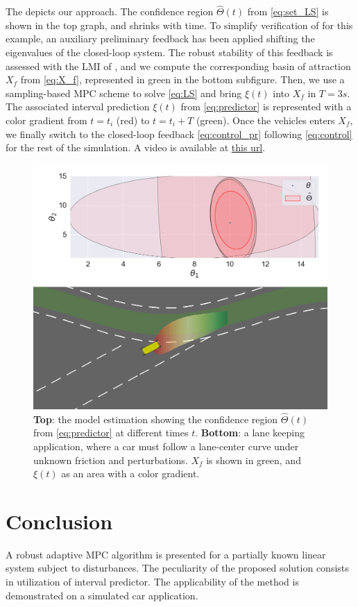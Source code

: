 \documentclass[letterpaper, 10 pt, conference]{ieeeconf}  %
\begin{document}
The  depicts our approach. The confidence region $\hat{\Theta}(t)$ from \eqref{eq:set_LS} is shown in the top graph, and shrinks with time. To simplify verification of  for this example, an auxiliary preliminary feedback has been applied shifting the eigenvalues of the closed-loop system. The robust stability of this feedback is assessed with the LMI of , and we compute the corresponding basin of attraction $X_f$ from \eqref{eq:X_f}, represented in green in the bottom subfigure. Then, we use a sampling-based MPC scheme \cite{HomemDeMello2014} to solve \eqref{eq:LS} and bring $\xi(t)$ into $X_f$ in $T=3s$.  The associated interval prediction $\xi(t)$ from \eqref{eq:predictor} is represented with a color gradient from $t=t_i$ (red) to $t=t_i+T$ (green). Once the vehicles enters $X_f$, we finally switch to the closed-loop feedback \eqref{eq:control_pr} following \eqref{eq:control} for the rest of the simulation. A video is available at \href{https://drive.google.com/file/d/18I6lPgAjS8buMB09OCF6WcHtHzUr_ql_/view?usp=sharing}{this url}.
\begin{figure}
    \centering
    \includegraphics[width=\linewidth]{img/lane-keeping.png}
    \caption{\textbf{Top}: the model estimation showing the confidence region $\hat{\Theta}(t)$ from \eqref{eq:predictor} at different times $t$. \textbf{Bottom}: a lane keeping application, where a car must follow a lane-center curve under unknown friction and perturbations. $X_f$ is shown in green, and $\xi(t)$ as an area with a color gradient.}
    \label{fig:lane-keeping}
\end{figure}

\section*{Conclusion}

A robust adaptive MPC algorithm is presented for a partially known
linear system subject to disturbances. The peculiarity of the proposed
solution consists in utilization of interval predictor. The applicability
of the method is demonstrated on a simulated car application.



\end{document}
